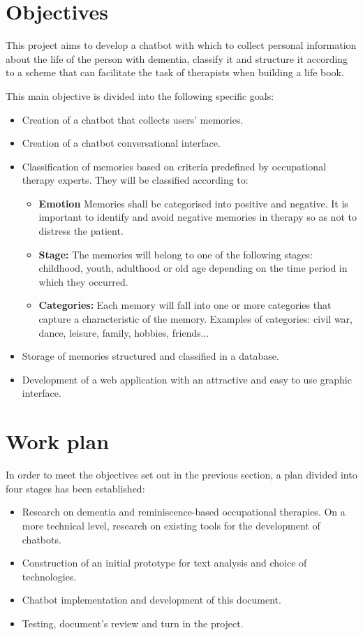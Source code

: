 \section{Objectives}

This project aims to develop a chatbot with which to collect personal information about the life of the person with dementia, classify it and structure it according to a scheme that can facilitate the task of therapists when building a life book.

This main objective is divided into the following specific goals:
\begin{itemize}
	\item Creation of a chatbot that collects users' memories.
	\item Creation of a chatbot conversational interface.
	\item Classification of memories based on criteria predefined by occupational therapy experts. They will be classified according to:
	\begin{itemize}
		\item \textbf{Emotion} Memories shall be categorised into positive and negative. It is important to identify and avoid negative memories in therapy so as not to distress the patient.
		\item \textbf{Stage:} The memories will belong to one of the following stages: childhood, youth, adulthood or old age depending on the time period in which they occurred.
		\item \textbf{Categories:} Each memory will fall into one or more categories that capture a characteristic of the memory. Examples of categories: civil war, dance, leisure, family, hobbies, friends...
	\end{itemize}
	\item Storage of memories structured and classified in a database.
	\item Development of a web application with an attractive and easy to use graphic interface.
\end{itemize}

\section{Work plan}

In order to meet the objectives set out in the previous section, a plan divided into four stages has been established:
\begin{itemize}
	\item Research on dementia and reminiscence-based occupational therapies. On a more technical level, research on existing tools for the development of chatbots.
	\item Construction of an initial prototype for text analysis and choice of technologies.
	\item Chatbot implementation and development of this document.
	\item Testing, document's review and turn in the project.
\end{itemize}







